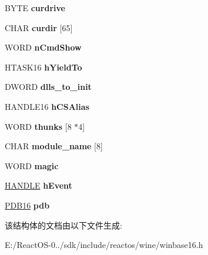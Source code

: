 \begin{DoxyCompactItemize}
B\+Y\+TE {\bfseries curdrive}
\item 
\mbox{\label{struct___t_d_b_a4cd1c580026659df094c70de86107aa2}} 
C\+H\+AR {\bfseries curdir} \mbox{[}65\mbox{]}
\item 
\mbox{\label{struct___t_d_b_a0c7f853430279e5acc1c11608c25a3e2}} 
W\+O\+RD {\bfseries n\+Cmd\+Show}
\item 
\mbox{\label{struct___t_d_b_a0de16e8950ee2add6a0fe660eb83ffb2}} 
H\+T\+A\+S\+K16 {\bfseries h\+Yield\+To}
\item 
\mbox{\label{struct___t_d_b_a23fdf95186d67c02f8041ba8d10b2641}} 
D\+W\+O\+RD {\bfseries dlls\+\_\+to\+\_\+init}
\item 
\mbox{\label{struct___t_d_b_ab52bdf2dcf32349050f73c97b5ca48c5}} 
H\+A\+N\+D\+L\+E16 {\bfseries h\+C\+S\+Alias}
\item 
\mbox{\label{struct___t_d_b_ab65f5de1334e03e869be678f8f7eba14}} 
W\+O\+RD {\bfseries thunks} \mbox{[}8 $\ast$4\mbox{]}
\item 
\mbox{\label{struct___t_d_b_a7e2b7b5619f144e1f8e8461e9cec62b9}} 
C\+H\+AR {\bfseries module\+\_\+name} \mbox{[}8\mbox{]}
\item 
\mbox{\label{struct___t_d_b_a23519bc6da4ea4c300dcb92fd0edc511}} 
W\+O\+RD {\bfseries magic}
\item 
\mbox{\label{struct___t_d_b_a71abaee1beb7e6ded826af00e6819a08}} 
\hyperlink{interfacevoid}{H\+A\+N\+D\+LE} {\bfseries h\+Event}
\item 
\mbox{\label{struct___t_d_b_a740bba9b674e0bc3ac8ee6a55ed790c9}} 
\hyperlink{struct_p_d_b16}{P\+D\+B16} {\bfseries pdb}
\end{DoxyCompactItemize}


该结构体的文档由以下文件生成\+:\begin{DoxyCompactItemize}
\item 
E\+:/\+React\+O\+S-\/0../sdk/include/reactos/wine/winbase16.\+h\end{DoxyCompactItemize}
